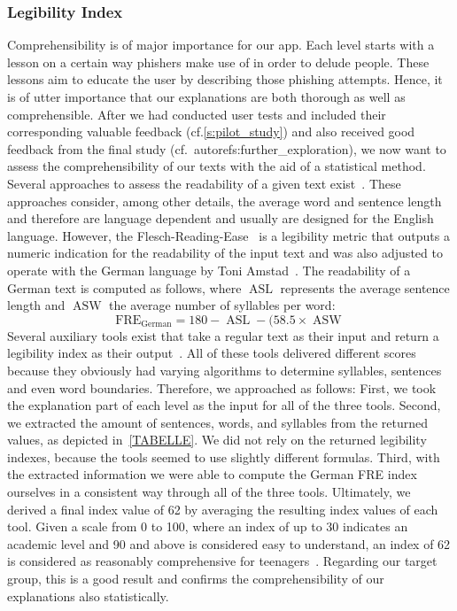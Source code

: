 \subsubsection{Legibility Index}
Comprehensibility is of major importance for our app. Each level starts with a lesson on a certain way phishers make use of in order to delude people. These lessons aim to educate the user by describing those phishing attempts. Hence, it is of utter importance that our explanations are both thorough as well as comprehensible. After we had conducted user tests and included their corresponding valuable feedback (cf.\autoref{s:pilot_study}) and also received good feedback from the final study (cf.~autoref{s:further_exploration}), we now want to assess the comprehensibility of our texts with the aid of a statistical method. Several approaches to assess the readability of a given text exist~\cite{Gun,citeulike:7369187}. These approaches consider, among other details, the average word and sentence length and therefore are language dependent and usually are designed for the English language. However, the Flesch-Reading-Ease~\cite{citeulike:7369187} is a legibility metric that outputs a numeric indication for the readability of the input text and was also adjusted to operate with the German language by Toni Amstad~\cite{amstad1978verstaendlich}. The readability of a German text is computed as follows, where $\operatorname{ASL}$ represents the average sentence length and $\operatorname{ASW}$ the average number of syllables per word:
$$\operatorname{FRE_{German}} = 180-\operatorname{ASL}-(58.5\times\operatorname{ASW}$$
Several auxiliary tools exist that take a regular text as their input and return a legibility index as their output~\cite{leichtlesbar, stilversprechend,fleschindexde}. All of these tools delivered different scores because they obviously had varying algorithms to determine syllables, sentences and even word boundaries.
Therefore, we approached as follows: First, we took the explanation part of each level as the input for all of the three tools. Second, we extracted the amount of sentences, words, and syllables from the returned values, as depicted in~\autoref{TABELLE}. We did not rely on the returned legibility indexes, because the tools seemed to use slightly different formulas. Third, with the extracted information we were able to compute the German FRE index ourselves in a consistent way through all of the three tools. Ultimately, we derived a final index value of 62 by averaging the resulting index values of each tool. Given a scale from 0 to 100, where an index of up to 30 indicates an academic level and 90 and above is considered easy to understand, an index of 62 is considered as reasonably comprehensive for teenagers~\cite{amstad1978verstandlich}. Regarding our target group, this is a good result and confirms the comprehensibility of our explanations also statistically.
